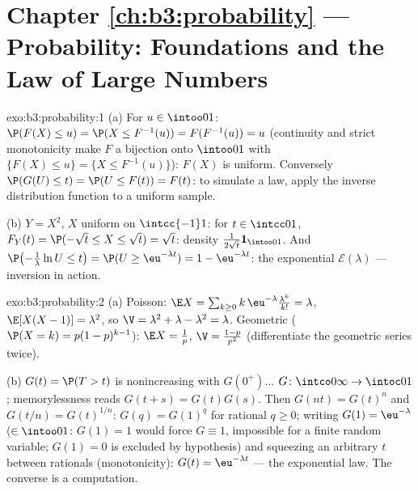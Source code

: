 \section*{Chapter \ref{ch:b3:probability} --- Probability:
Foundations and the Law of Large Numbers}

\begin{solution}{exo:b3:probability:1}
(a) For $u \in \intoo01$: $\P(F(X) \leq u) = \P(X \leq
F^{-1}(u)) = F(F^{-1}(u)) = u$ (continuity and strict
monotonicity make $F$ a bijection onto $\intoo01$ with
$\{F(X) \leq u\} = \{X \leq F^{-1}(u)\}$): $F(X)$ is uniform.
Conversely $\P(G(U) \leq t) = \P(U \leq F(t)) = F(t)$: to
simulate a law, apply the inverse distribution function to a
uniform sample.

(b) $Y = X^2$, $X$ uniform on $\intcc{-1}1$: for $t \in
\intcc01$, $F_Y(t) = \P(-\sqrt t \leq X \leq \sqrt t) = \sqrt
t$: density $\frac1{2\sqrt t}\mathbf 1_{\intoo01}$. And
$\P\bigl(-\frac1\lambda\ln U \leq t\bigr) = \P(U \geq
\eu^{-\lambda t}) = 1 - \eu^{-\lambda t}$: the exponential
$\mathcal E(\lambda)$ --- inversion in action.
\end{solution}

\begin{solution}{exo:b3:probability:2}
(a) Poisson: $\E X = \sum_{k\geq0}k\,\eu^{-\lambda}
\frac{\lambda^k}{k!} = \lambda$, $\E[X(X-1)] = \lambda^2$, so
$\V = \lambda^2 + \lambda - \lambda^2 = \lambda$. Geometric
($\P(X = k) = p(1-p)^{k-1}$): $\E X = \frac1p$, $\V =
\frac{1-p}{p^2}$ (differentiate the geometric series twice).

(b) $G(t) = \P(T > t)$ is nonincreasing with $G(0^+)\dots$
$G \colon \intco0\infty \to \intoc01$; memorylessness reads
$G(t + s) = G(t)G(s)$. Then $G(n t) = G(t)^n$ and $G(t/n) =
G(t)^{1/n}$: $G(q) = G(1)^q$ for rational $q \geq 0$; writing
$G(1) = \eu^{-\lambda}$ ($\in \intoo01$: $G(1) = 1$ would
force $G \equiv 1$, impossible for a finite random variable;
$G(1) = 0$ is excluded by hypothesis) and squeezing an
arbitrary $t$ between rationals (monotonicity): $G(t) =
\eu^{-\lambda t}$ --- the exponential law. The converse is a
computation.
\end{solution}

